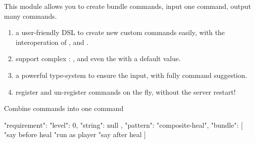 
This module allows you to create bundle commands, input one command, output many commands.


\begin{enumerate}
    \item {a user-friendly DSL to create new custom commands easily, with the interoperation of ,  and .}
    \item {support complex : ,  and even the  with a default value.}
    \item {a powerful type-system to ensure the  input, with fully command suggestion.}
    \item {register and un-register commands on the fly, without the server restart!}
\end{enumerate}

\begin{example}{Combine commands into one command}
    \begin{json}
    {
        "requirement": {
        "level": 0,
        "string": null
    },
        "pattern": "composite-heal",
        "bundle": [
        "say before heal %
        "run as player %
        "say after heal %
        ]
    }

    \end{json}

\end{example}
